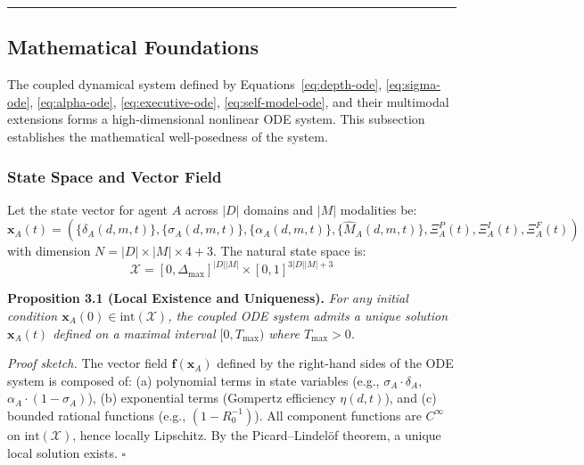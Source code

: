 \documentclass[11pt,a4paper]{article}
\begin{document}
\noindent\rule{\linewidth}{0.4pt}

\subsection{Mathematical Foundations}\label{sec:math-foundations}

The coupled dynamical system defined by Equations~\eqref{eq:depth-ode},
\eqref{eq:sigma-ode}, \eqref{eq:alpha-ode}, \eqref{eq:executive-ode},
\eqref{eq:self-model-ode}, and their multimodal extensions forms a
high-dimensional nonlinear ODE system. This subsection establishes the
mathematical well-posedness of the system.

\subsubsection{State Space and Vector Field}\label{sec:state-space}

Let the state vector for agent $A$ across $|D|$ domains and $|M|$
modalities be:
\begin{equation}\label{eq:state-vector}
\mathbf{x}_A(t) = \left(\{\delta_A(d,m,t)\}, \{\sigma_A(d,m,t)\}, \{\alpha_A(d,m,t)\}, \{\hat{M}_A(d,m,t)\}, \Xi_A^P(t), \Xi_A^I(t), \Xi_A^F(t)\right)
\end{equation}
with dimension $N = |D|\times|M|\times 4 + 3$. The natural state space is:
\begin{equation}\label{eq:state-space}
\mathcal{X} = [0, \Delta_{\max}]^{ |D||M| } \times [0,1]^{3|D||M| + 3}
\end{equation}

\textbf{Proposition 3.1 (Local Existence and Uniqueness).}
\textit{For any initial condition $\mathbf{x}_A(0) \in \text{int}(\mathcal{X})$,
the coupled ODE system admits a unique solution $\mathbf{x}_A(t)$ defined
on a maximal interval $[0, T_{\max})$ where $T_{\max} > 0$.}

\textit{Proof sketch.} The vector field $\mathbf{f}(\mathbf{x}_A)$ defined
by the right-hand sides of the ODE system is composed of: (a) polynomial
terms in state variables (e.g., $\sigma_A \cdot \delta_A$, $\alpha_A \cdot (1-\sigma_A)$),
(b) exponential terms (Gompertz efficiency $\eta(d,t)$), and (c) bounded
rational functions (e.g., $(1 - R_0^{-1})$). All component functions are
$C^\infty$ on $\text{int}(\mathcal{X})$, hence locally Lipschitz. By the
Picard--Lindel\"of theorem, a unique local solution exists. $\square$
\end{document}

